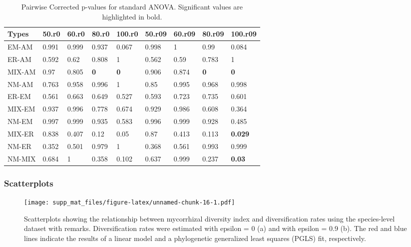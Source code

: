 \documentclass[]{article}
\begin{document}
\begin{table}[H]

\caption{\label{tab:unnamed-chunk-15}Pairwise Corrected p-values for standard ANOVA. Significant values are highlighted in bold.}
\centering
\begin{tabular}{l|l|l|l|l|l|l|l|l}
\hline
Types & 50.r0 & 60.r0 & 80.r0 & 100.r0 & 50.r09 & 60.r09 & 80.r09 & 100.r09\\
\hline
EM-AM & 0.991 & 0.999 & 0.937 & 0.067 & 0.998 & 1 & 0.99 & 0.084\\
\hline
ER-AM & 0.592 & 0.62 & 0.808 & 1 & 0.562 & 0.59 & 0.783 & 1\\
\hline
MIX-AM & 0.97 & 0.805 & \textbf{0} & \textbf{0} & 0.906 & 0.874 & \textbf{0} & \textbf{0}\\
\hline
NM-AM & 0.763 & 0.958 & 0.996 & 1 & 0.85 & 0.995 & 0.968 & 0.998\\
\hline
ER-EM & 0.561 & 0.663 & 0.649 & 0.527 & 0.593 & 0.723 & 0.735 & 0.601\\
\hline
MIX-EM & 0.937 & 0.996 & 0.778 & 0.674 & 0.929 & 0.986 & 0.608 & 0.364\\
\hline
NM-EM & 0.997 & 0.999 & 0.935 & 0.583 & 0.996 & 0.999 & 0.928 & 0.485\\
\hline
MIX-ER & 0.838 & 0.407 & 0.12 & 0.05 & 0.87 & 0.413 & 0.113 & \textbf{0.029}\\
\hline
NM-ER & 0.352 & 0.501 & 0.979 & 1 & 0.368 & 0.561 & 0.993 & 0.999\\
\hline
NM-MIX & 0.684 & 1 & 0.358 & 0.102 & 0.637 & 0.999 & 0.237 & \textbf{0.03}\\
\hline
\end{tabular}
\end{table}

\hypertarget{scatterplots-1}{%
\subsubsection{Scatterplots}\label{scatterplots-1}}

\begin{figure}
\centering
\texttt{[image: supp\_mat\_files/figure-latex/unnamed-chunk-16-1.pdf]}
\caption{Scatterplots showing the relationship between mycorrhizal
diversity index and diversification rates using the species-level
dataset with remarks. Diversification rates were estimated with epsilon
= 0 (a) and with epsilon = 0.9 (b). The red and blue lines indicate the
results of a linear model and a phylogenetic generalized least squares
(PGLS) fit, respectively.}
\end{figure}
\end{document}
